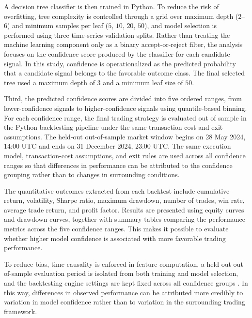 A decision tree classifier is then trained in Python. To reduce the risk of
overfitting, tree complexity is controlled through a grid over maximum depth
($2$--$6$) and minimum samples per leaf ($5$, $10$, $20$, $50$), and model
selection is performed using three time-series validation splits. Rather than
treating the machine learning component only as a binary accept-or-reject
filter, the analysis focuses on the confidence score produced by the classifier
for each candidate signal. In this study, confidence is operationalized as the
predicted probability that a candidate signal belongs to the favorable outcome
class. The final selected tree used a maximum depth of $3$ and a minimum leaf
size of $50$.

Third, the predicted confidence scores are divided into five ordered ranges,
from lower-confidence signals to higher-confidence signals using quantile-based
binning. For each confidence range, the final trading strategy is evaluated out
of sample in the Python backtesting pipeline under the same transaction-cost
and exit assumptions. The held-out out-of-sample market window begins on
28 May 2024, 14:00 UTC and ends on 31 December 2024, 23:00 UTC. The same
execution model, transaction-cost assumptions, and exit rules are used across
all confidence ranges so that differences in performance can be attributed to
the confidence grouping rather than to changes in surrounding conditions.

The quantitative outcomes extracted from each backtest include cumulative
return, volatility, Sharpe ratio, maximum drawdown, number of trades, win
rate, average trade return, and profit factor. Results are presented using
equity curves and drawdown curves, together with summary tables comparing the
performance metrics across the five confidence ranges. This makes it possible
to evaluate whether higher model confidence is associated with more favorable
trading performance.

To reduce bias, time causality is enforced in feature computation, a held-out
out-of-sample evaluation period is isolated from both training and model
selection, and the backtesting engine settings are kept fixed across all
confidence groups \citep{mt5_copy_rates_range}.
In this way, differences in observed performance can be attributed more
credibly to variation in model confidence rather than to variation in the
surrounding trading framework.







